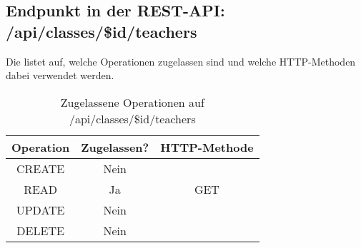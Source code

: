 \subsection{Endpunkt in der REST-API: /api/classes/\$id/teachers}
Die  listet auf, welche Operationen zugelassen sind und welche HTTP-Methoden dabei verwendet werden. 


\begin{table}[!htbp]
	\begin{tabular}{|c|c|c|}
		\hline
			\textbf{Operation} & \textbf{Zugelassen?} & \textbf{HTTP-Methode} \\ \hline
			CREATE & Nein & \\ \hline 
			READ & Ja & GET \\ \hline
			UPDATE & Nein & \\ \hline 
			DELETE & Nein & \\ \hline
	\end{tabular}

		\caption{Zugelassene Operationen auf /api/classes/\$id/teachers}
		\label{tab:rest:api:classes:id:teachers:meth}
\end{table}

